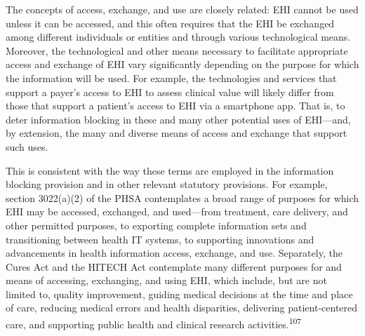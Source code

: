 \documentclass[twoside,11pt]{article}
\begin{document}
          The concepts of access, exchange, and use are closely related: EHI cannot be used unless it can be accessed, and this often requires that the EHI be exchanged among different individuals or entities and through various technological means. Moreover, the technological and other means necessary to facilitate appropriate access and exchange of EHI vary significantly depending on the purpose for which the information will be used. For example, the technologies and services that support a payer's access to EHI to assess clinical value will likely differ from those that support a patient's access to EHI via a smartphone app. That is, to deter information blocking in these and many other potential uses of EHI—and, by extension, the many and diverse means of access and exchange that support such uses.



          This is consistent with the way these terms are employed in the information blocking provision and in other relevant statutory provisions. For example, section 3022(a)(2) of the PHSA contemplates a broad range of purposes for which EHI may be accessed, exchanged, and used—from treatment, care delivery, and other permitted purposes, to exporting complete information sets and transitioning between health IT systems, to supporting innovations and advancements in health information access, exchange, and use. Separately,  \ifhmode\expandafter\xspace\fi the Cures Act and the HITECH Act contemplate many different purposes for and means of accessing, exchanging, and using EHI, which include, but are not limited to, quality improvement, guiding medical decisions at the time and place of care, reducing medical errors and health disparities, delivering patient-centered care, and supporting public health and clinical research activities.\textsuperscript{107}
            
          


\end{document}
